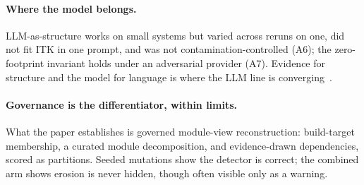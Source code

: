 \paragraph{Where the model belongs.} LLM-as-structure works on small systems but varied across
reruns on one, did not fit ITK in one prompt, and was not contamination-controlled (A6); the
zero-footprint invariant holds under an adversarial provider (A7). Evidence for structure and the model for language is where the LLM line is
converging~\cite{sathvika2026views,angermeir2026reproducibility}.

\paragraph{Governance is the differentiator, within limits.} What the paper establishes is
governed module-view reconstruction: build-target membership, a curated module decomposition, and
evidence-drawn dependencies, scored as partitions. 
Seeded mutations show the detector is correct; the combined
arm shows erosion is never hidden, though often visible only as a warning.

